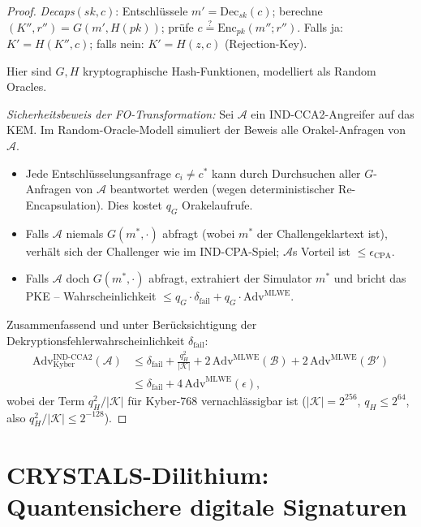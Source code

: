 ﻿\documentclass[a4paper,12pt]{article}
\theoremstyle{definition}
\begin{document}
\begin{proof}
\emph{Decaps}$(sk, c)$: Entschlüssele $m' = \mathrm{Dec}_{sk}(c)$;
berechne $(K'', r'') = G(m', H(pk))$; prüfe $c \stackrel{?}{=} \mathrm{Enc}_{pk}(m''; r'')$.
Falls ja: $K' = H(K'', c)$; falls nein: $K' = H(z, c)$ (Rejection-Key).

Hier sind $G, H$ kryptographische Hash-Funktionen, modelliert als Random Oracles.

\emph{Sicherheitsbeweis der FO-Transformation:}
Sei $\mathcal{A}$ ein IND-CCA2-Angreifer auf das KEM. Im Random-Oracle-Modell
simuliert der Beweis alle Orakel-Anfragen von $\mathcal{A}$.

\begin{itemize}
\item Jede Entschlüsselungsanfrage $c_i \neq c^*$ kann durch
  Durchsuchen aller $G$-Anfragen von $\mathcal{A}$ beantwortet werden
  (wegen deterministischer Re-Encapsulation). Dies kostet $q_G$ Orakelaufrufe.

\item Falls $\mathcal{A}$ niemals $G(m^*, \cdot)$ abfragt (wobei $m^*$
  der Challengeklartext ist), verhält sich der Challenger wie im
  IND-CPA-Spiel; $\mathcal{A}$s Vorteil ist $\leq \epsilon_\mathrm{CPA}$.

\item Falls $\mathcal{A}$ doch $G(m^*, \cdot)$ abfragt, extrahiert der
  Simulator $m^*$ und bricht das PKE -- Wahrscheinlichkeit $\leq q_G \cdot
  \delta_\mathrm{fail} + q_G \cdot \mathrm{Adv}^\mathrm{MLWE}$.
\end{itemize}

Zusammenfassend und unter Berücksichtigung der
Dekryptionsfehlerwahrscheinlichkeit $\delta_\mathrm{fail}$:
\begin{align*}
\mathrm{Adv}^{\mathrm{IND\text{-}CCA2}}_{\mathrm{Kyber}}(\mathcal{A})
&\leq \delta_\mathrm{fail}
  + \frac{q_H^2}{|\mathcal{K}|}
  + 2\,\mathrm{Adv}^\mathrm{MLWE}(\mathcal{B})
  + 2\,\mathrm{Adv}^\mathrm{MLWE}(\mathcal{B}') \\
&\leq \delta_\mathrm{fail} + 4\,\mathrm{Adv}^\mathrm{MLWE}(\epsilon),
\end{align*}
wobei der Term $q_H^2/|\mathcal{K}|$ für Kyber-768 vernachlässigbar ist
($|\mathcal{K}| = 2^{256}$, $q_H \leq 2^{64}$, also $q_H^2/|\mathcal{K}| \leq 2^{-128}$).
\end{proof}

\section{CRYSTALS-Dilithium: Quantensichere digitale Signaturen}
\end{document}
